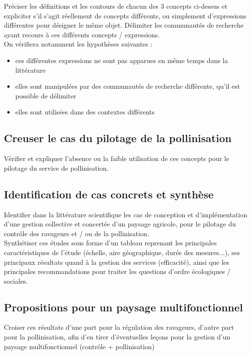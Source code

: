 \documentclass[11pt,a4paper,final]{article}
\begin{document}
Préciser les définitions et les contours de chacun des 3 concepts ci-dessus et expliciter s'il s'agit réellement de concepts différents, ou simplement d'expressions différentes pour désigner le même objet. Délimiter les communautés de recherche ayant recours à ces différents concepts / expressions.\\

On vérifiera notamment les hypothèses suivantes :

\begin{itemize}
\medskip 
\item ces différentes expressions ne sont pas apparues en même temps dans la littérature
\item elles sont manipulées par des communautés de recherche différente, qu'il est possible de délimiter
\item elles sont utilisées dans des contextes différents
\end{itemize}


\subsection{Creuser le cas du pilotage de la pollinisation}

Vérifier et expliquer l'absence ou la faible utilisation de ces concepts pour le pilotage du service de pollinisation.

\subsection{Identification de cas concrets et synthèse}

Identifier dans la littérature scientifique les cas de conception et d'implémentation d'une gestion collective et concertée d'un paysage agricole, pour le pilotage du contrôle des ravageurs et / ou de la pollinisation.\\

Synthétiser ces études sous forme d'un tableau reprenant les principales caractéristiques de l'étude (échelle, aire géographique, durée des mesures...), ses principaux résultats quand à la gestion des 
services (efficacité), ainsi que les principales recommandations pour traiter les questions d'ordre écologiques / sociales.

\subsection{Propositions pour un paysage multifonctionnel}

Croiser ces résultats d'une part pour la régulation des ravageurs, d'autre part pour la pollinisation, afin d'en tirer d'éventuelles leçons pour la gestion d'un paysage multifonctionnel (contrôle + pollinisation)

\newpage



\end{document}
